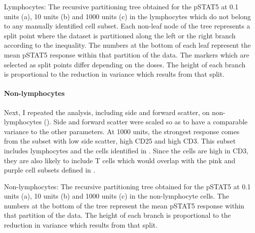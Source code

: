 {
    Lymphocytes: The recursive partitioning tree obtained for the pSTAT5 at 0.1 units (a), 10 units (b) and 1000 units (c) in the lymphocytes which
  do not belong to any manually identified cell subset.
}
{
  Each non-leaf node of the tree represents a split point where the dataset is partitioned along the left or the right branch
  according to the inequality.
  The numbers at the bottom of each leaf represent the mean pSTAT5 response within that partition of the data.
  The markers which are selected as split points differ depending on the doses.
  The height of each branch is proportional to the reduction in variance which results from that split.
}

\paragraph{Non-lymphocytes}

Next, I repeated the analysis, including side and forward scatter, on non-lymphocytes ().
Side and forward scatter were scaled so as to have a comparable variance to the other parameters.
At 1000 units, the strongest response comes from the subset with low side scatter, high CD25 and high CD3.
This subset includes lymphocytes and the cells identified in .
Since the cells are high in CD3, they are also likely to include T cells which would overlap with the pink and purple cell subsets
defined in .

{
  Non-lymphocytes: The recursive partitioning tree obtained for the pSTAT5 at 0.1 units (a), 10 units (b) and 1000 units (c) in the non-lymphocyte cells.
}
{
  The numbers at the bottom of the tree represent the mean pSTAT5 response within that partition of the data.
  The height of each branch is proportional to the reduction in variance which results from that split.
}



